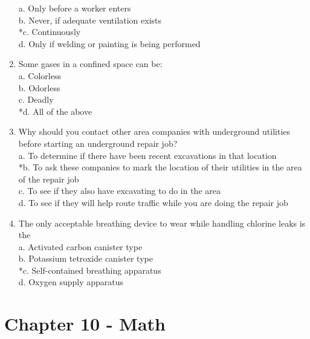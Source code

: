 \begin{enumerate}[1.]
a. Only before a worker enters\\
b. Never, if adequate ventilation exists\\
*c. Continuously\\
d. Only if welding or painting is being performed\\
\item Some gases in a confined space can be:\\
a. Colorless\\
b. Odorless\\
c. Deadly\\
*d. All of the above\\
\item Why should you contact other area companies with underground utilities before starting an underground repair job?\\
a. To determine if there have been recent excavations in that location\\
*b. To ask these companies to mark the location of their utilities in the area of the repair job\\
c. To see if they also have excavating to do in the area\\
d. To see if they will help route traffic while you are doing the repair job\\
\item The only acceptable breathing device to wear while handling chlorine leaks is the\\
a. Activated carbon canister type\\
b. Potassium tetroxide canister type\\
*c. Self-contained breathing apparatus\\
d. Oxygen supply apparatus\\
  \end{enumerate}
  
  \newpage
  \section{Chapter 10 - Math}
  
  
